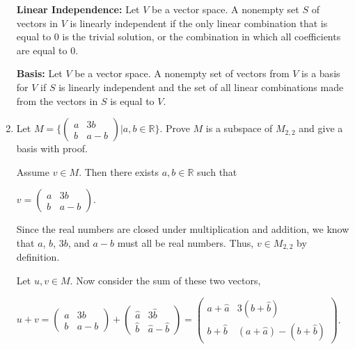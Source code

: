 \documentclass[12pt, a4paper]{article}
\begin{document}
\begin{enumerate}
    \vspace{4mm}
    
    \textbf{Linear Independence: }Let $V$ be a vector space. A nonempty set $S$ of vectors in $V$ is linearly independent if the only linear combination that is equal to 0 is the trivial solution, or the combination in which all coefficients are equal to 0.
    
    \vspace{4mm}
    
    \textbf{Basis: }Let $V$ be a vector space. A nonempty set of vectors from $V$ is a basis for $V$ if $S$ is linearly independent and the set of all linear combinations made from the vectors in $S$ is equal to $V$.
    
    \vspace{4mm}
    
    \item Let $M=\Big\{\left( \begin{array}{cc} a & 3b\\ b & a-b\end{array}\right)| a,b\in\mathbb{R}\Big\}$. Prove $M$ is a subspace of $M_{2,2}$ and give a basis with proof.
    
    \vspace{4mm}
    
    Assume $v\in M$. Then there exists $a,b\in\mathbb{R}$ such that\par
    
    \vspace{4mm}
    
    \centerline{$v=\left( \begin{array}{cc} a & 3b\\ b & a-b\end{array}\right)$.}
    
    \vspace{4mm}
    
    Since the real numbers are closed under multiplication and addition, we know that $a$, $b$, $3b$, and $a-b$ must all be real numbers. Thus, $v\in M_{2,2}$ by definition.
    
    \hspace{4mm}Let $u,v\in M$. Now consider the sum of these two vectors,\par
    
    \vspace{4mm}
    
\centerline{$u+v=\left( \begin{array}{cc} a & 3b\\ b & a-b\end{array}\right)+\left( \begin{array}{cc} \hat{a} & 3\hat{b}\\ \hat{b} & \hat{a}-\hat{b}\end{array}\right)=\left( \begin{array}{cc} a+\hat{a} & 3(b+\hat{b})\\ b+\hat{b} & (a+\hat{a})-(b+\hat{b})\end{array}\right)$.}



\end{enumerate}
\end{document}
